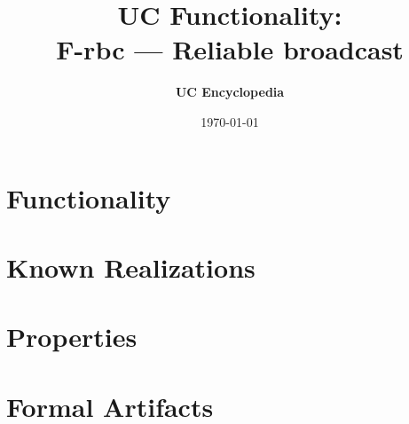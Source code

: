 \documentclass[11pt,a4paper]{article}
\title{\textbf{\Large UC Functionality:}\\[0.2em] \Large F-rbc --- Reliable broadcast}
\author{\textbf{UC Encyclopedia}}
\date{\today}
\newtheorem{functionality}{Functionality}
\begin{document}
\maketitle

\begin{abstract}
\end{abstract}

\section{Functionality}

%

\section{Known Realizations}


\section{Properties}


\section{Formal Artifacts}

\end{document}
